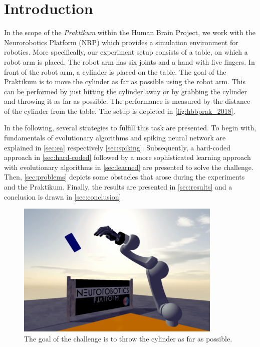 \section{Introduction}
\label{sec:intro}
In the scope of the \textit{Praktikum} within the Human Brain Project, we work with the Neurorobotics Platform (NRP) which provides a simulation environment for robotics.
More specifically, our experiment setup consists of a table, on which a robot arm is placed.
The robot arm has six joints and a hand with five fingers.
In front of the robot arm, a cylinder is placed on the table.
The goal of the Praktikum is to move the cylinder as far as possible using the robot arm.
This can be performed by just hitting the cylinder away or by grabbing the cylinder and throwing it as far as possible.
The performance is measured by the distance of the cylinder from the table.
The setup is depicted in \autoref{fig:hbbprak_2018}.

In the following, several strategies to fulfill this task are presented.
To begin with, fundamentals of evolutionary algorithms and spiking neural network are explained in \autoref{sec:ea} respectively \autoref{sec:spiking}.
Subsequently, a hard-coded approach in \autoref{sec:hard-coded} followed by a more sophisticated learning approach with evolutionary algorithms in \autoref{sec:learned} are presented to solve the challenge.
Then, \autoref{sec:problems} depicts some obstacles that arose during the experiments and the Praktikum.
Finally, the results are presented in \autoref{sec:results} and a conclusion is drawn in \autoref{sec:conclusion}

\begin{figure}[h]
\centering
\includegraphics[width=.95\columnwidth]{figures/hbpprak_2018.png}
\caption{The goal of the challenge is to throw the cylinder as far as possible.}
\label{fig:hbbprak_2018}
\end{figure}